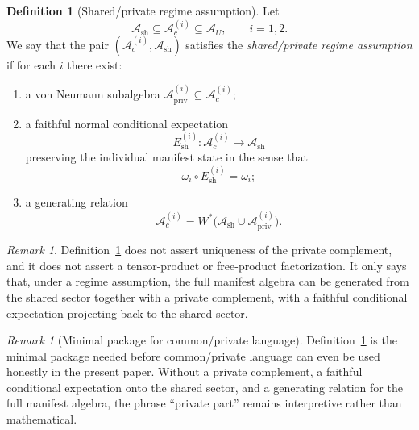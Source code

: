 \documentclass[12pt]{article}
\theoremstyle{definition}
\newtheorem{definition}[theorem]{Definition}
\theoremstyle{remark}
\newtheorem{remark}[theorem]{Remark}
\begin{document}
\begin{definition}[Shared/private regime assumption]
\label{def:regime}
Let
\[
\mathcal A_{\mathrm{sh}}
\subseteq
\mathcal A_c^{(i)}
\subseteq
\mathcal A_U,
\qquad
i=1,2.
\]
We say that the pair
\((\mathcal A_c^{(i)},\mathcal A_{\mathrm{sh}})\) satisfies the
\emph{shared/private regime assumption} if for each \(i\) there exist:
\begin{enumerate}
\item a von Neumann subalgebra
  \(\mathcal A_{\mathrm{priv}}^{(i)}\subseteq \mathcal A_c^{(i)}\);
\item a faithful normal conditional expectation
  \[
  E_{\mathrm{sh}}^{(i)}:\mathcal A_c^{(i)}\to \mathcal A_{\mathrm{sh}}
  \]
  preserving the individual manifest state in the sense that
  \[
  \omega_i\circ E_{\mathrm{sh}}^{(i)}=\omega_i;
  \]
\item a generating relation
  \[
  \mathcal A_c^{(i)}
  =
  W^*\!\bigl(\mathcal A_{\mathrm{sh}}\cup
  \mathcal A_{\mathrm{priv}}^{(i)}\bigr).
  \]
\end{enumerate}
\end{definition}

\begin{remark}
Definition~\ref{def:regime} does not assert uniqueness of the private
complement, and it does not assert a tensor-product or free-product
factorization. It only says that, under a regime assumption, the full
manifest algebra can be generated from the shared sector together with a
private complement, with a faithful conditional expectation projecting
back to the shared sector.
\end{remark}

\begin{remark}[Minimal package for common/private language]
Definition~\ref{def:regime} is the minimal package needed before
common/private language can even be used honestly in the present paper.
Without a private complement, a faithful conditional expectation onto
the shared sector, and a generating relation for the full manifest
algebra, the phrase ``private part'' remains interpretive rather than
mathematical.
\end{remark}
\end{document}
